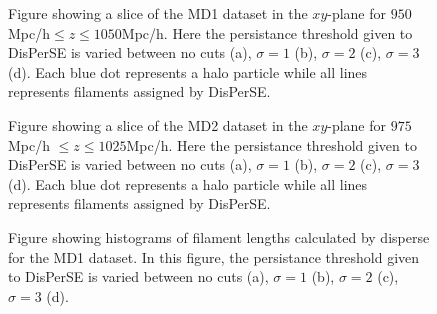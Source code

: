 \begin{figure}[H]
    \hspace{1em}%
    \hspace{1em}%
    \caption{Figure showing a slice of the MD1 dataset in the $xy$-plane for $950$Mpc/h$\leq z\leq1050$Mpc/h. Here the persistance threshold given to DisPerSE is varied between no cuts (a), $\sigma=1$ (b), $\sigma=2$ (c), $\sigma=3$ (d). Each blue dot represents a halo particle while all lines represents filaments assigned by DisPerSE.}
    \label{fig:scatterMD1}
\end{figure}
\begin{figure}[H]
    \hspace{2em}%
    \hspace{2em}%
    \caption{Figure showing a slice of the MD2 dataset in the $xy$-plane for $975$Mpc/h $\leq z\leq1025$Mpc/h. Here the persistance threshold given to DisPerSE is varied between no cuts (a), $\sigma=1$ (b), $\sigma=2$ (c), $\sigma=3$ (d). Each blue dot represents a halo particle while all lines represents filaments assigned by DisPerSE.}
    \label{fig:scatterMD2}
\end{figure}

\begin{figure}[H]
    \hspace{1em}%
    \hspace{1em}%
    \caption{Figure showing histograms of filament lengths calculated by disperse for the MD1 dataset. In this figure, the persistance threshold given to DisPerSE is varied between no cuts (a), $\sigma=1$ (b), $\sigma=2$ (c), $\sigma=3$ (d). }
    \label{fig:histMD1}
\end{figure}

